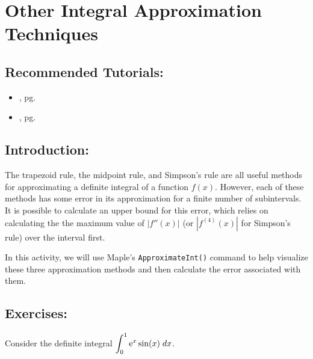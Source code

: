 \section{Other Integral Approximation Techniques}
\label{sec:approximate_integration}	

\subsection*{Recommended Tutorials:}
\begin{itemize}[noitemsep]
    \item {}, pg. \pageref{chp:derivative}
	\item {}, pg. \pageref{chp:riemann_sums_and_area_approximation}
\end{itemize}

\subsection*{Introduction:}

The trapezoid rule, the midpoint rule, and Simpson's rule are all useful methods for approximating a definite integral of a function $f(x)$. However, each of these methods has some error in its approximation for a finite number of subintervals. It is possible to calculate an upper bound for this error, which relies on calculating the the maximum value of $|f''(x)|$ (or $|f^{(4)}(x)|$ for Simpson's rule) over the interval first.

In this activity, we will use Maple's \texttt{ApproximateInt()} command to help visualize these three approximation methods and then calculate the error associated with them.

\subsection*{Exercises:}

Consider the definite integral $\displaystyle\int_{0}^1 {\rm e}^x\sin(x) \; dx$.


